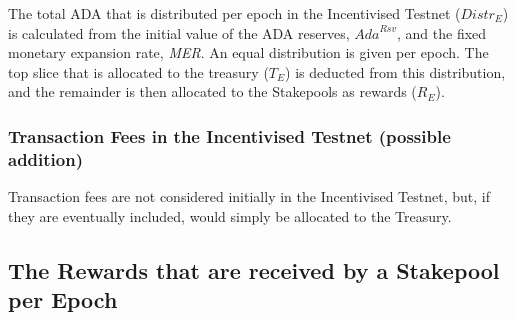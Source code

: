 \documentclass[11pt,a4paper,dvipsnames,twosided,final]{article}
\newcommand{\ada}{ADA{}}
\begin{document}
\noindent
The total \ada{} that is distributed per epoch in the Incentivised Testnet (${\textit{Distr}}_E$) is calculated from the initial
value of the \ada{} reserves, $\textit{Ada}^{\textit{Rsv}}$, and the fixed monetary expansion rate, \textit{MER}.
An equal distribution is given per epoch.  The top slice that is allocated to the treasury ($T_E$) is
deducted from this distribution, and the remainder is then allocated to the Stakepools as rewards ($R_E$).

\subsubsection*{Transaction Fees in the Incentivised Testnet (possible addition)}

Transaction fees are not considered initially in the Incentivised Testnet, but, if they are eventually included, would simply be allocated to
the Treasury.


\subsection{The Rewards that are received by a Stakepool per Epoch}
\end{document}
